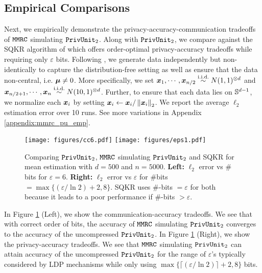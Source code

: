 \subsection{Empirical Comparisons}
\label{subsec:mmrc_privunit_empirical}
Next, we empirically demonstrate the privacy-accuracy-communication tradeoffs of $\texttt{MMRC}$ simulating $\texttt{PrivUnit}_2$. Along with $\texttt{PrivUnit}_2$, we compare against the SQKR algorithm of \cite{CKO20} which offers order-optimal privacy-accuracy tradeoffs while requiring only $\varepsilon$ bits. Following \cite{CKO20}, we generate data independently but non-identically to capture the distribution-free setting as well as ensure that the data non-central, i.e. ${\boldsymbol{\mu}} \neq 0$. More specifically, we set ${\boldsymbol{x}}_1,\cdots,{\boldsymbol{x}}_{n/2} \overset{\text{i.i.d.}}{\sim} N(1,1)^{\otimes d}$ and ${\boldsymbol{x}}_{n/2+1},\cdots,{\boldsymbol{x}}_{n} \overset{\text{i.i.d.}}{\sim} N(10,1)^{\otimes d}$. Further, to ensure that each data lies on $\mathbb{S}^{d-1}$, we normalize each ${\boldsymbol{x}}_i$ by setting ${\boldsymbol{x}}_i \leftarrow {\boldsymbol{x}}_i/\left\lVert {\boldsymbol{x}}_i \right\rVert_2$. We report the average $\ell_2$ estimation error over 10 runs. See more variations in Appendix \ref{appendix:mmrc_pu_emp}. 

\begin{figure}[h]
\centering
\texttt{[image: figures/cc6.pdf]} \qquad
\texttt{[image: figures/eps1.pdf]}%
\caption{Comparing $\texttt{PrivUnit}_2$, $\texttt{MMRC}$ simulating $\texttt{PrivUnit}_2$ and SQKR for mean estimation with $d = 500$ and $n = 5000$. \textbf{Left:} $\ell_2$ error vs $\#$bits for $\varepsilon = 6$. \textbf{Right:} $\ell_2$ error vs $\varepsilon$ for $\#$bits $= \max\{( \varepsilon/ \ln 2) + 2, 8\}$. SQKR uses $\#$-bits $= \varepsilon$ for both because it leads to a poor performance if $\#$-bits $ > \varepsilon$.}
\label{fig:mean}
\end{figure}

In Figure \ref{fig:mean} (Left), we show the communication-accuracy tradeoffs. We see that with correct order of bits, the accuracy of $\texttt{MMRC}$ simulating $\texttt{PrivUnit}_2$ converges to the accuracy of the uncompressed $\texttt{PrivUnit}_2$. In Figure \ref{fig:mean} (Right), we show the privacy-accuracy tradeoffs. We see that $\texttt{MMRC}$ simulating $\texttt{PrivUnit}_2$ can attain accuracy of the uncompressed $\texttt{PrivUnit}_2$ for the range of  $\varepsilon$'s typically considered by LDP mechanisms while only using $\max\{\lceil( \varepsilon/ \ln 2)\rceil + 2, 8\}$ bits.